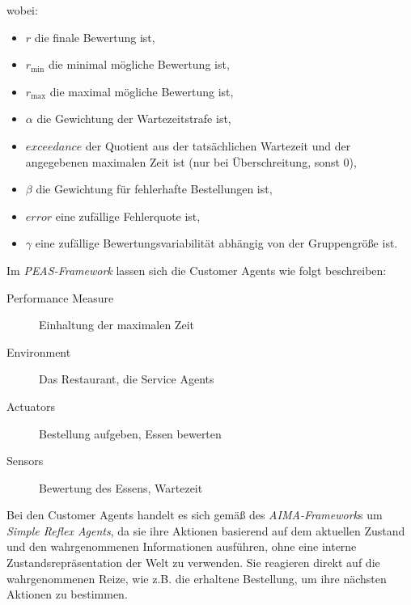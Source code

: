 wobei:
\begin{itemize}
    \item $r$ die finale Bewertung ist,
    \item $r_{\text{min}}$ die minimal mögliche Bewertung ist,
    \item $r_{\text{max}}$ die maximal mögliche Bewertung ist,
    \item $\alpha$ die Gewichtung der Wartezeitstrafe ist,
    \item $exceedance$ der Quotient aus der tatsächlichen Wartezeit und der angegebenen maximalen Zeit ist (nur bei Überschreitung, sonst 0),
    \item $\beta$ die Gewichtung für fehlerhafte Bestellungen ist,
    \item $error$ eine zufällige Fehlerquote ist,
    \item $\gamma$ eine zufällige Bewertungsvariabilität abhängig von der Gruppengröße ist.
\end{itemize}

Im \emph{PEAS-Framework} lassen sich die Customer Agents wie folgt beschreiben:
\begin{description}
    \item[Performance Measure] Einhaltung der maximalen Zeit
    \item[Environment] Das Restaurant, die Service Agents
    \item[Actuators] Bestellung aufgeben, Essen bewerten
    \item[Sensors] Bewertung des Essens, Wartezeit
\end{description}

Bei den Customer Agents handelt es sich gemäß des \emph{AIMA-Framework}s um \emph{Simple Reflex Agents}, da sie ihre Aktionen basierend auf dem aktuellen Zustand und den wahrgenommenen Informationen ausführen, ohne eine interne Zustandsrepräsentation der Welt zu verwenden. Sie reagieren direkt auf die wahrgenommenen Reize, wie z.B. die erhaltene Bestellung, um ihre nächsten Aktionen zu bestimmen.